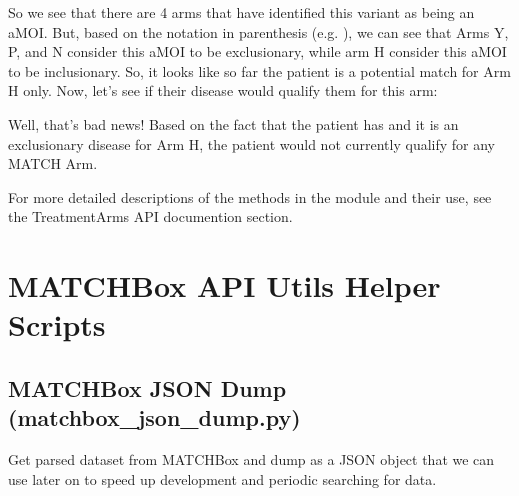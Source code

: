 \documentclass[letterpaper,10pt,english]{sphinxmanual}
\begin{document}
So we see that there are 4 arms that have identified this variant as being an aMOI.
But, based on the notation in parenthesis (e.g. ), we can see that Arms Y, P,
and N consider this aMOI to be exclusionary, while arm H consider this aMOI to be
inclusionary.  So, it looks like so far the patient is a potential match for Arm H
only.  Now, let’s see if their disease would qualify them for this arm:

%
\begin{sphinxVerbatim}[commandchars=\\\{\}]
\PYG{g+go}{[u\PYGZsq{}Papillary thyroid carcinoma\PYGZsq{},}
\PYG{g+go}{ u\PYGZsq{}Colorectal cancer, NOS\PYGZsq{}]}
\end{sphinxVerbatim}

Well, that’s bad news!  Based on the fact that the patient has  and it is
an exclusionary disease for Arm H, the patient would not currently qualify for any
MATCH Arm.

For more detailed descriptions of the methods in the module and their use, see the
TreatmentArms API documention section.


\chapter{MATCHBox API Utils Helper Scripts}
\label{\detokenize{helper_scripts:matchbox-api-utils-helper-scripts}}\label{\detokenize{helper_scripts::doc}}

\section{MATCHBox JSON Dump (matchbox\_json\_dump.py)}
\label{\detokenize{helper_scripts:matchbox-json-dump-matchbox-json-dump-py}}
Get parsed dataset from MATCHBox and dump as a JSON object that we can use
later on to speed up development and periodic searching for data.
\end{document}
